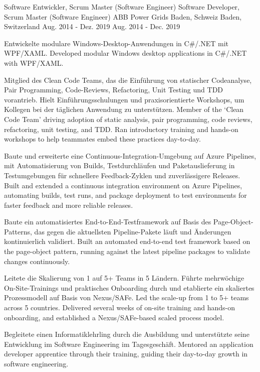 \begin{cventries}
	\cventry
	{
			{ Software Entwickler, Scrum Master (Software Engineer) }
			{ Software Developer, Scrum Master (Software Engineer) }
	} %
	{ABB Power Grids} %
	{
			{ Baden, Schweiz }
			{ Baden, Switzerland }
	} %
	{
			{ Aug. 2014 - Dez. 2019 }
			{ Aug. 2014 - Dec. 2019 }
	} %
	{
		\begin{cvitems}
			\item {
				{
					Entwickelte modulare Windows-Desktop-Anwendungen in C\#/.NET mit WPF/XAML.
				}
				{
					Developed modular Windows desktop applications in C\#/.NET with WPF/XAML.
				}
			}
			\item{
				{
					Mitglied des \glqq Clean Code Teams\grqq{}, das die Einführung von statischer Codeanalyse, Pair Programming, Code-Reviews, Refactoring, Unit Testing und TDD vorantrieb. Hielt Einführungsschulungen und praxisorientierte Workshops, um Kollegen bei der täglichen Anwendung zu unterstützen.
				}
				{
					Member of the `Clean Code Team' driving adoption of static analysis, pair programming, code reviews, refactoring, unit testing, and TDD. Ran introductory training and hands-on workshops to help teammates embed these practices day-to-day.
				}
			}
			\item{
				{
					Baute und erweiterte eine Continuous-Integration-Umgebung auf Azure Pipelines, mit Automatisierung von Builds, Testdurchläufen und Paketauslieferung in Testumgebungen für schnellere Feedback-Zyklen und zuverlässigere Releases.
				}
				{
					Built and extended a continuous integration environment on Azure Pipelines, automating builds, test runs, and package deployment to test environments for faster feedback and more reliable releases.
				}
			}
			\item{
				{
					Baute ein automatisiertes End-to-End-Testframework auf Basis des Page-Object-Patterns, das gegen die aktuellsten Pipeline-Pakete läuft und Änderungen kontinuierlich validiert.
				}
				{
					Built an automated end-to-end test framework based on the page-object pattern, running against the latest pipeline packages to validate changes continuously.
				}
			}	
			\item{
				{
					Leitete die Skalierung von 1 auf 5+ Teams in 5 Ländern. Führte mehrwöchige On-Site-Trainings und praktisches Onboarding durch und etablierte ein skaliertes Prozessmodell auf Basis von Nexus/SAFe.
				}
				{
					Led the scale-up from 1 to 5+ teams across 5 countries. Delivered several weeks of on-site training and hands-on onboarding, and established a Nexus/SAFe-based scaled process model.
				}
			}		
			\item {
				{
					Begleitete einen Informatiklehrling durch die Ausbildung und unterstützte seine Entwicklung im Software Engineering im Tagesgeschäft.
				}
				{
					Mentored an application developer apprentice through their training, guiding their day-to-day growth in software engineering.
				}
			}  		
		\end{cvitems}
	}	
\end{cventries}
